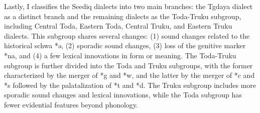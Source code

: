 Lastly, I classifies the Seediq dialects into two main branches: the Tgdaya dialect as a distinct branch and the remaining dialects as the Toda-Truku subgroup, including Central Toda, Eastern Toda, Central Truku, and Eastern Truku dialects. This subgroup shares several changes: (1) sound changes related to the historical schwa *ə, (2) sporadic sound changes, (3) loss of the genitive marker *na, and (4) a few lexical innovations in form or meaning. The Toda-Truku subgroup is further divided into the Toda and Truku subgroups, with the former characterized by the merger of *g and *w, and the latter by the merger of *c and *s followed by the palatalization of *t and *d. The Truku subgroup includes more sporadic sound changes and lexical innovations, while the Toda subgroup has fewer evidential features beyond phonology.